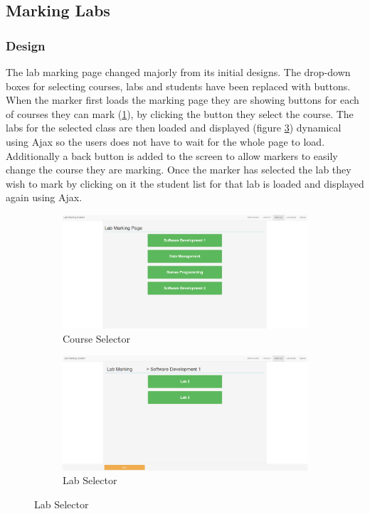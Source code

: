 \documentclass[12pt]{article}  %
\begin{document}
\subsection{Marking Labs}


\subsubsection{Design}
The lab marking page changed majorly from its initial designs. The drop-down boxes for selecting courses, labs and students have been replaced with buttons. When the marker first loads the marking page they are showing buttons for each of courses they can mark (\ref{fig:marking-course}), by clicking the button they select the course. The labs for the selected class are then loaded and displayed (figure \ref{fig:marking-lab}) dynamical using Ajax so the users does not have to wait for the whole page to load. Additionally a back button is added to the screen to allow markers to easily change the course they are marking. Once the marker has selected the lab they wish to mark by clicking on it the student list for that lab is loaded and displayed again using Ajax.

\begin{figure}[H]
\caption{Lab Marking Page}
\centering
\begin{subfigure}[c]{0.45\textwidth}
    \includegraphics[width=1\textwidth]{images/implementation/marking-1-page.png}
    \caption{Course Selector}
    \label{fig:marking-course}
\end{subfigure}
\hfill
\begin{subfigure}[c]{0.45\textwidth}
    \includegraphics[width=1\textwidth]{images/implementation/marking-2-page.png}
    \caption{Lab Selector}
    \label{fig:marking-lab}
\end{subfigure}

\end{figure}
\end{document}
